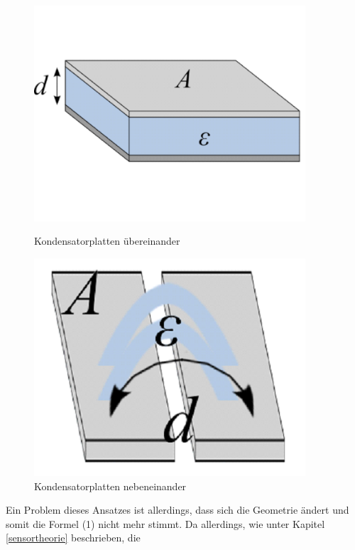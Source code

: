 \begin{figure}[ht]
    \centering
    \begin{minipage}{0.45\textwidth}
        \includegraphics[width=0.9\textwidth]{dennis/kond1}
        \caption{Kondensatorplatten übereinander}
        \label{fig:kond1}
    \end{minipage}
    \begin{minipage}{0.45\textwidth}
        \includegraphics[width=0.9\textwidth]{dennis/kond2}
        \caption{Kondensatorplatten nebeneinander}
        \label{fig:kond2}
    \end{minipage}
\end{figure}
Ein Problem dieses Ansatzes ist allerdings, dass sich die Geometrie ändert und somit die
Formel (1) nicht mehr stimmt. Da allerdings, wie unter Kapitel \ref{sensortheorie} beschrieben, die
